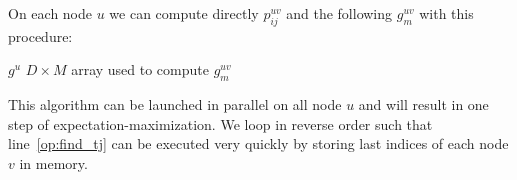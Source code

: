 \documentclass[a4paper]{article}
\begin{document}
On each node $u$ we can compute directly $p_{ij}^{uv}$ and the following $g^{uv}_m$ with this procedure:
\begin{algorithmic}[1]
\REQUIRE $g^u$ $D \times M$ array used to compute $g^{uv}_m$
		 \label{op:find_tj}
			\ENDIF
			\ELSE
			\ENDIF
		\ENDWHILE
	\ENDFOR \\
	\ENDFOR
\ENDFOR
\end{algorithmic}
%
This algorithm can be launched in parallel on all node $u$ and will result in one step of expectation-maximization.
We loop in reverse order such that line~\ref{op:find_tj} can be executed very quickly by storing last indices of each
node $v$ in memory.




\end{document}
